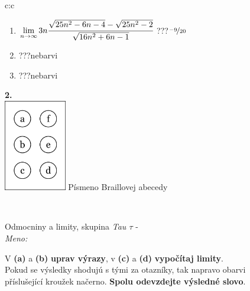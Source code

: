 \documentclass[10pt]{report}
\begin{document}
\begin{tabular}{c:c}
\begin{minipage}[c][104.5mm][t]{0.5\linewidth}
\begin{center}
\begin{minipage}{0.79\linewidth}
\begin{center}
\begin{varwidth}{\linewidth}
\begin{enumerate}
\item $\lim\limits_{n\to\infty}3n\cfrac{\sqrt{25n^2-6n-4}-\sqrt{25n^2-2}}{\sqrt{16n^2+6n-1}}$\quad \dotfill\; ???\;\dotfill \quad $\nicefrac{-9}{20}$
\item \quad \dotfill\; ???\;\dotfill \quad nebarvi
\item \quad \dotfill\; ???\;\dotfill \quad nebarvi
\end{enumerate}
\end{varwidth}
\end{center}
\end{minipage}
\begin{minipage}{0.20\linewidth}
\begin{center}
{\Huge\bfseries 2.} \\[2mm]
\includegraphics[height=40mm]{../images/braille.png}
{\small Písmeno Braillovej abecedy}
\end{center}
\end{minipage}
\end{center}
\end{minipage}
\\ \hdashline
\begin{minipage}[c][104.5mm][t]{0.5\linewidth}
\begin{center}
\vspace{7mm}
{\huge Odmocniny a limity, skupina \textit{Tau $\tau$} -}\\[5mm]
\textit{Meno:}\phantom{xxxxxxxxxxxxxxxxxxxxxxxxxxxxxxxxxxxxxxxxxxxxxxxxxxxxxxxxxxxxxxxxx}\\[5mm]
\begin{minipage}{0.95\linewidth}
\begin{center}
V \textbf{(a)} a \textbf{(b)} \textbf{uprav výrazy}, v \textbf{(c)} a \textbf{(d)} \textbf{vypočítaj limity}.\\Pokud se výsledky shodujú s tými za otazníky, tak napravo obarvi\\příslušející kroužek načerno. \textbf{Spolu odevzdejte výsledné slovo}.
\end{center}
\end{minipage}
\\[1mm]

\end{center}
\end{minipage}
\end{tabular}
\end{document}
